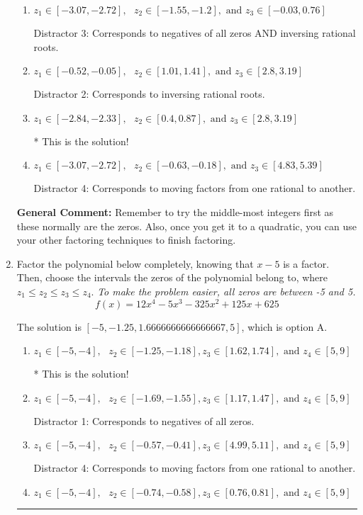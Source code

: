 \documentclass{extbook}[14pt]
\newcommand{\litem}[1]{\item #1

\rule{\textwidth}{0.4pt}}
\begin{document}
\begin{enumerate}
{\begin{enumerate}[label=\Alph*.]
 Distractor 1: Corresponds to negatives of all zeros.
\item \( z_1 \in [-3.07, -2.72], \text{   }  z_2 \in [-1.55, -1.2], \text{   and   } z_3 \in [-0.03, 0.76] \)

 Distractor 3: Corresponds to negatives of all zeros AND inversing rational roots.
\item \( z_1 \in [-0.52, -0.05], \text{   }  z_2 \in [1.01, 1.41], \text{   and   } z_3 \in [2.8, 3.19] \)

 Distractor 2: Corresponds to inversing rational roots.
\item \( z_1 \in [-2.84, -2.33], \text{   }  z_2 \in [0.4, 0.87], \text{   and   } z_3 \in [2.8, 3.19] \)

* This is the solution!
\item \( z_1 \in [-3.07, -2.72], \text{   }  z_2 \in [-0.63, -0.18], \text{   and   } z_3 \in [4.83, 5.39] \)

 Distractor 4: Corresponds to moving factors from one rational to another.
\end{enumerate}

\textbf{General Comment:} Remember to try the middle-most integers first as these normally are the zeros. Also, once you get it to a quadratic, you can use your other factoring techniques to finish factoring.
}
\litem{
Factor the polynomial below completely, knowing that $x-5$ is a factor. Then, choose the intervals the zeros of the polynomial belong to, where $z_1 \leq z_2 \leq z_3 \leq z_4$. \textit{To make the problem easier, all zeros are between -5 and 5.}
\[ f(x) = 12x^{4} -5 x^{3} -325 x^{2} +125 x + 625 \]

The solution is \( [-5, -1.25, 1.6666666666666667, 5] \), which is option A.\begin{enumerate}[label=\Alph*.]
\item \( z_1 \in [-5, -4], \text{   }  z_2 \in [-1.25, -1.18], z_3 \in [1.62, 1.74], \text{   and   } z_4 \in [5, 9] \)

* This is the solution!
\item \( z_1 \in [-5, -4], \text{   }  z_2 \in [-1.69, -1.55], z_3 \in [1.17, 1.47], \text{   and   } z_4 \in [5, 9] \)

 Distractor 1: Corresponds to negatives of all zeros.
\item \( z_1 \in [-5, -4], \text{   }  z_2 \in [-0.57, -0.41], z_3 \in [4.99, 5.11], \text{   and   } z_4 \in [5, 9] \)

 Distractor 4: Corresponds to moving factors from one rational to another.
\item \( z_1 \in [-5, -4], \text{   }  z_2 \in [-0.74, -0.58], z_3 \in [0.76, 0.81], \text{   and   } z_4 \in [5, 9] \)


\end{enumerate}}
\end{enumerate}
\end{document}
